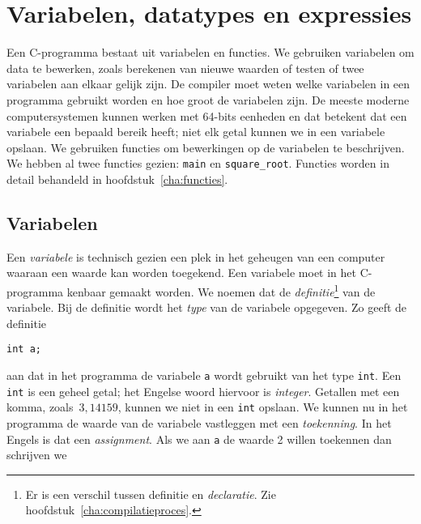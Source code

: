 \chapter{Variabelen, datatypes en expressies}
\label{cha:vardatexp}
\thispagestyle{empty}

Een C-programma bestaat uit variabelen en functies. We gebruiken variabelen om data te bewerken, zoals berekenen van nieuwe waarden of testen of twee variabelen aan elkaar gelijk zijn. De compiler moet weten welke variabelen in een programma gebruikt worden en hoe groot de variabelen zijn. De meeste moderne computersystemen kunnen werken met 64-bits eenheden en dat betekent dat een variabele een bepaald bereik heeft; niet elk getal kunnen we in een variabele opslaan.
We gebruiken functies om bewerkingen op de variabelen te beschrijven. We hebben al twee functies gezien: \texttt{main} en \texttt{square\_root}. Functies worden in detail behandeld in hoofdstuk~\ref{cha:functies}.


\section{Variabelen}
Een \textsl{variabele} is technisch gezien een plek in het geheugen van een computer waaraan een waarde kan worden toegekend. Een variabele moet in het C-programma kenbaar gemaakt worden. We noemen dat de \textsl{definitie}\footnote{Er is een verschil tussen definitie en \textsl{declaratie}. Zie hoofdstuk~\ref{cha:compilatieproces}.} van de variabele. Bij de definitie wordt het \textsl{type} van de variabele opgegeven. Zo geeft de definitie

\hspace*{1em}\texttt{int a;}

aan dat in het programma de variabele \texttt{a} wordt gebruikt van het type \texttt{int}. Een \texttt{int} is een geheel getal; het Engelse woord hiervoor is \textsl{integer}. Getallen met een komma, zoals~$3,14159$, kunnen we niet in een \texttt{int} opslaan. We kunnen nu in het programma de waarde van de variabele vastleggen met een \textsl{toekenning}. In het Engels is dat een \textsl{assignment}. Als we aan \texttt{a} de waarde 2 willen toekennen dan schrijven we

